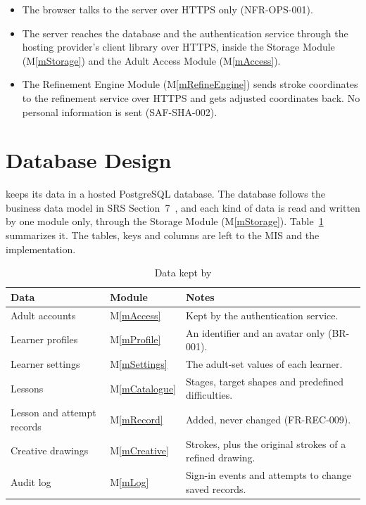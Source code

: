 \documentclass[12pt, titlepage]{article}
\newcommand{\mref}[1]{M\ref{#1}}
\begin{document}
\begin{itemize}
\item The browser talks to the \progname{} server over HTTPS only (NFR-OPS-001).
\item The server reaches the database and the authentication service through
  the hosting provider's client library over HTTPS, inside the Storage Module
  (\mref{mStorage}) and the Adult Access Module (\mref{mAccess}).
\item The Refinement Engine Module (\mref{mRefineEngine}) sends stroke
  coordinates to the refinement service over HTTPS and gets adjusted
  coordinates back. No personal information is sent (SAF-SHA-002).
\end{itemize}

\section{Database Design} \label{SecDB}

\progname{} keeps its data in a hosted PostgreSQL database. The database follows
the business data model in SRS Section~7~\citep{SRS}, and each kind of data is
read and written by one module only, through the Storage Module
(\mref{mStorage}). Table~\ref{TblDB} summarizes it. The
tables, keys and columns are left to the MIS and the implementation.

\begin{table}[H]
\centering
\begin{tabular}{p{} p{}
>{\raggedright\arraybackslash}p{}}
\toprule
\textbf{Data} & \textbf{Module} & \textbf{Notes}\\
\midrule
Adult accounts & \mref{mAccess} & Kept by the authentication service.\\
Learner profiles & \mref{mProfile} & An identifier and an avatar only
(BR-001).\\
Learner settings & \mref{mSettings} & The adult-set values of each learner.\\
Lessons & \mref{mCatalogue} & Stages, target shapes and predefined
difficulties.\\
Lesson and attempt records & \mref{mRecord} & Added, never changed
(FR-REC-009).\\
Creative drawings & \mref{mCreative} & Strokes, plus the original strokes of a
refined drawing.\\
Audit log & \mref{mLog} & Sign-in events and attempts to change saved
records.\\
\bottomrule
\end{tabular}
\caption{Data kept by \progname{}}
\label{TblDB}
\end{table}
\end{document}
